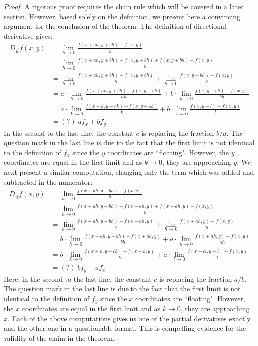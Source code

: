 \documentclass[handout]{ximera}
\begin{document}
\begin{proof}
A rigorous proof requires the chain rule which will be covered in a later section. 
However, based solely on the definition, we present here a convincing argument for the conclusion of the theorem. 
The definition of directional derivative gives:
\begin{align*}
D_{\vec u} f(x,y) &= \lim_{h \to 0} \frac{f(x + ah, y + bh) -f(x,y)}{h} \\
                  &= \lim_{h \to 0} \frac{f(x + ah, y + bh) - f(x , y+ bh) + f(x, y+bh) -f(x,y)}{h} \\
                  &= \lim_{h \to 0} \frac{f(x + ah, y + bh) - f(x , y+ bh)}{h} + \lim_{h \to 0} \frac{f(x , y+ bh) -f(x,y)}{h} \\
                  &= a\cdot \lim_{h \to 0} \frac{f(x + ah, y + bh) - f(x , y+ bh)}{ah} + b\cdot \lim_{h \to 0} \frac{f(x , y+ bh) -f(x,y)}{bh} \\
                  &= a\cdot \lim_{k \to 0} \frac{f(x + k, y + ck) - f(x , y+ ck)}{k} + b\cdot \lim_{l \to 0} \frac{f(x , y+ l) -f(x,y)}{l} \\
                  &= (?) \; a f_x + bf_y
\end{align*}
In the second to the last line, the constant $c$ is replacing the fraction $b/a$.  The question mark in the last line is due to the fact that the first limit is not
identical to the definition of $f_x$ since the $y$ coordinates are ``floating".  
However, the $y$ coordinates are equal in the first limit and as $k \to 0$, they are approaching $y$.
We next present a similar computation, changing only the term which was added and subtracted in the numerator:
\begin{align*}
D_{\vec u} f(x,y) &= \lim_{h \to 0} \frac{f(x + ah, y + bh) -f(x,y)}{h} \\
                  &= \lim_{h \to 0} \frac{f(x + ah, y + bh) - f(x+ah , y) + f(x+ah, y) -f(x,y)}{h} \\
                  &= \lim_{h \to 0} \frac{f(x + ah, y + bh) - f(x+ah, y)}{h} + \lim_{h \to 0} \frac{f(x+ah , y) -f(x,y)}{h} \\
                  &= b\cdot \lim_{h \to 0} \frac{f(x + ah, y + bh) - f(x+ah , y)}{bh} + a\cdot \lim_{h \to 0} \frac{f(x+ah , y) -f(x,y)}{ah} \\
                  &= b\cdot \lim_{k \to 0} \frac{f(x + k, y + ck) - f(x+k , y)}{k} + a\cdot \lim_{l \to 0} \frac{f(x+ cl , y+ l) -f(x,y)}{l} \\
                  &= (?)\;  b f_y + af_x
\end{align*}
Here, in the second to the last line, the constant $c$ is replacing the fraction $a/b$.  The question mark in the last line is due to the fact that the first limit is not
identical to the definition of $f_y$ since the $x$ coordinates are ``floating".  
However, the $x$ coordinates are equal in the first limit and as $k \to 0$, they are approaching $x$.
Each of the above computations gives us one of the partial derivatives exactly and the other one in a questionable format. 
This is compelling evidence for the validity of the claim in the theorem.
\end{proof}
\end{document}

